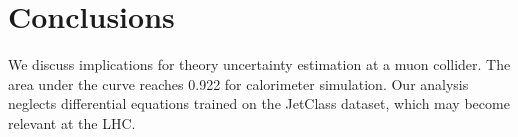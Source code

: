 \section{Conclusions}\label{sec:conclusions}

We discuss implications for theory uncertainty estimation at a muon
collider. The area under the curve reaches 0.922 for calorimeter
simulation. Our analysis neglects differential equations trained on the
JetClass dataset, which may become relevant at the LHC.

